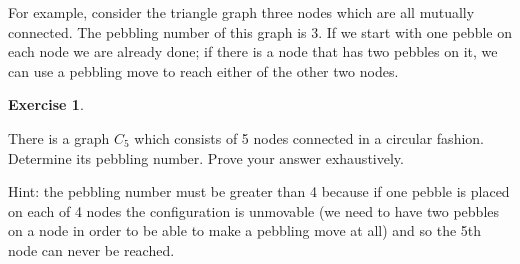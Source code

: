 \documentclass[10pt,]{book}
\theoremstyle{plain}
\theoremstyle{definition}
\theoremstyle{definition}
\newtheorem{exercise}[theorem]{Exercise}
\numberwithin{equation}{section}
\begin{document}
    For example, consider the triangle graph \textemdash{} three nodes which are all
    mutually connected. The pebbling number of this graph is 3. If we
    start with one pebble on each node we are already done; if there is a
    node that has two pebbles on it, we can use a pebbling move to reach
    either of the other two nodes.
\begin{exercise}\label{exercise-25}

        There is a graph \(C_5\) which consists of 5 nodes connected in a circular
        fashion. Determine its pebbling number. Prove your answer exhaustively.
\par

        Hint: the pebbling number must be greater than 4 because if one pebble is
        placed on each of 4 nodes the configuration is unmovable (we need to
        have two pebbles on a node in order to be able to make a pebbling move
        at all) and so the 5th node can never be reached.
\end{exercise}
\typeout{************************************************}
\typeout{************************************************}
\end{document}
